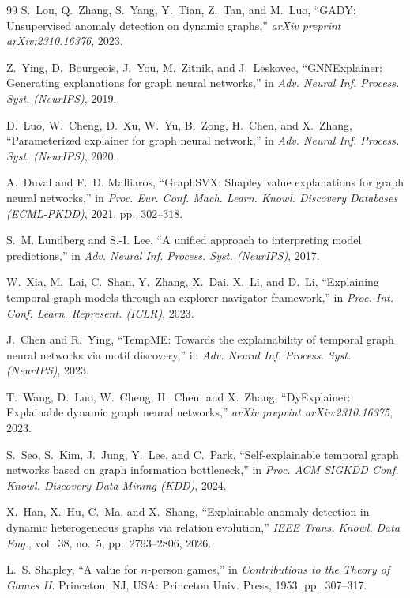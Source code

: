 \documentclass[conference]{IEEEtran}
\begin{document}
\begin{thebibliography}{99}
S.~Lou, Q.~Zhang, S.~Yang, Y.~Tian, Z.~Tan, and M.~Luo, ``GADY: Unsupervised
anomaly detection on dynamic graphs,'' \emph{arXiv preprint arXiv:2310.16376},
2023.

Z.~Ying, D.~Bourgeois, J.~You, M.~Zitnik, and J.~Leskovec, ``GNNExplainer:
Generating explanations for graph neural networks,'' in \emph{Adv. Neural Inf.
Process. Syst. (NeurIPS)}, 2019.

D.~Luo, W.~Cheng, D.~Xu, W.~Yu, B.~Zong, H.~Chen, and X.~Zhang, ``Parameterized
explainer for graph neural network,'' in \emph{Adv. Neural Inf. Process. Syst.
(NeurIPS)}, 2020.

A.~Duval and F.~D. Malliaros, ``GraphSVX: Shapley value explanations for graph
neural networks,'' in \emph{Proc. Eur. Conf. Mach. Learn. Knowl. Discovery
Databases (ECML-PKDD)}, 2021, pp.~302--318.

S.~M. Lundberg and S.-I. Lee, ``A unified approach to interpreting model
predictions,'' in \emph{Adv. Neural Inf. Process. Syst. (NeurIPS)}, 2017.

W.~Xia, M.~Lai, C.~Shan, Y.~Zhang, X.~Dai, X.~Li, and D.~Li, ``Explaining
temporal graph models through an explorer-navigator framework,'' in
\emph{Proc. Int. Conf. Learn. Represent. (ICLR)}, 2023.

J.~Chen and R.~Ying, ``TempME: Towards the explainability of temporal graph
neural networks via motif discovery,'' in \emph{Adv. Neural Inf. Process. Syst.
(NeurIPS)}, 2023.

T.~Wang, D.~Luo, W.~Cheng, H.~Chen, and X.~Zhang, ``DyExplainer: Explainable
dynamic graph neural networks,'' \emph{arXiv preprint arXiv:2310.16375}, 2023.

S.~Seo, S.~Kim, J.~Jung, Y.~Lee, and C.~Park, ``Self-explainable temporal graph
networks based on graph information bottleneck,'' in \emph{Proc. ACM SIGKDD
Conf. Knowl. Discovery Data Mining (KDD)}, 2024.

X.~Han, X.~Hu, C.~Ma, and X.~Shang, ``Explainable anomaly detection in dynamic
heterogeneous graphs via relation evolution,'' \emph{IEEE Trans. Knowl. Data
Eng.}, vol.~38, no.~5, pp.~2793--2806, 2026.

L.~S. Shapley, ``A value for $n$-person games,'' in \emph{Contributions to the
Theory of Games II}. Princeton, NJ, USA: Princeton Univ. Press, 1953,
pp.~307--317.


\end{thebibliography}
\end{document}
